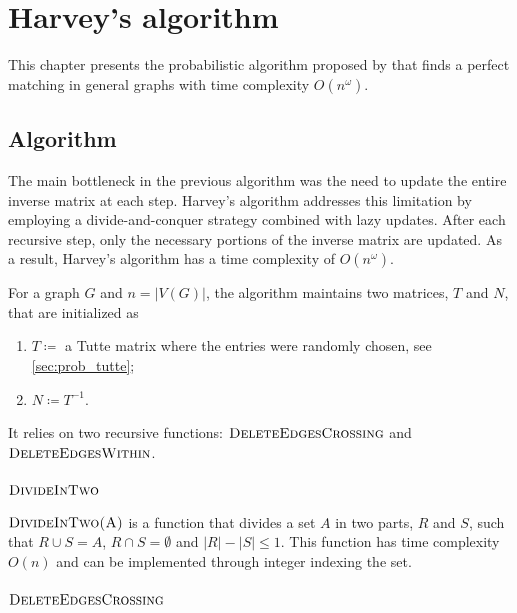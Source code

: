 \chapter{Harvey's algorithm}
\label{chap:harvey}

This chapter presents the probabilistic algorithm proposed by \citet{Harvey:Paper} that finds a perfect matching in general graphs with time complexity \(O(n^\omega)\).

\section{Algorithm}

The main bottleneck in the previous algorithm was the need to update the entire inverse matrix at each step. 
Harvey's algorithm addresses this limitation by employing a divide-and-conquer strategy combined with lazy updates. 
After each recursive step, only the necessary portions of the inverse matrix are updated.
As a result, Harvey's algorithm has a time complexity of \(O(n^\omega)\).

For a graph \(G\) and \(n = |V(G)|\),
the algorithm maintains two matrices, \(T\) and \(N\), that are initialized as
\begin{enumerate}
  \item \(T \coloneqq \) a Tutte matrix where the entries were randomly chosen, see \cref{sec:prob_tutte};
    \item \(N \coloneqq T^{-1}\).
\end{enumerate}
It relies on two recursive functions: \(\textsc{DeleteEdgesCrossing}\) and \(\textsc{DeleteEdgesWithin}\). 

\subsection{\(\textsc{DivideInTwo}\)}
\(\textsc{DivideInTwo(A)}\) is a function that divides a set \(A\) in two parts, \(R\) and \(S\), such that \(R \cup S = A\), \(R \cap S = \emptyset\) and \(|R| - |S| \leq 1\).
This function has time complexity \(O(n)\) and can be implemented through integer indexing the set.

\subsection{\(\textsc{DeleteEdgesCrossing}\)}

